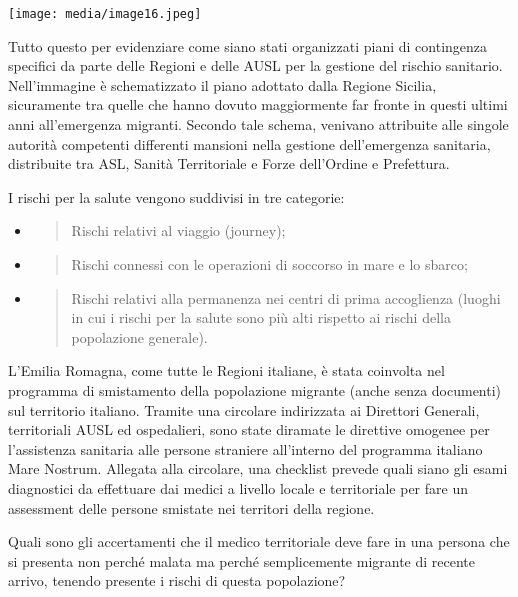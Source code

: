 \documentclass[]{article}
\begin{document}
\texttt{[image: media/image16.jpeg]}

Tutto questo per evidenziare come siano stati organizzati piani di
contingenza specifici da parte delle Regioni e delle AUSL per la
gestione del rischio sanitario. Nell'immagine è schematizzato il piano
adottato dalla Regione Sicilia, sicuramente tra quelle che hanno dovuto
maggiormente far fronte in questi ultimi anni all'emergenza migranti.
Secondo tale schema, venivano attribuite alle singole autorità
competenti differenti mansioni nella gestione dell'emergenza sanitaria,
distribuite tra ASL, Sanità Territoriale e Forze dell'Ordine e
Prefettura.

I rischi per la salute vengono suddivisi in tre categorie:

\begin{itemize}
\item
  \begin{quote}
  Rischi relativi al viaggio (journey);
  \end{quote}
\item
  \begin{quote}
  Rischi connessi con le operazioni di soccorso in mare e lo sbarco;
  \end{quote}
\item
  \begin{quote}
  Rischi relativi alla permanenza nei centri di prima accoglienza
  (luoghi in cui i rischi per la salute sono più alti rispetto ai rischi
  della popolazione generale).
  \end{quote}
\end{itemize}

L'Emilia Romagna, come tutte le Regioni italiane, è stata coinvolta nel
programma di smistamento della popolazione migrante (anche senza
documenti) sul territorio italiano. Tramite una circolare indirizzata ai
Direttori Generali, territoriali AUSL ed ospedalieri, sono state
diramate le direttive omogenee per l'assistenza sanitaria alle persone
straniere all'interno del programma italiano Mare Nostrum. Allegata alla
circolare, una checklist prevede quali siano gli esami diagnostici da
effettuare dai medici a livello locale e territoriale per fare un
assessment delle persone smistate nei territori della regione.

Quali sono gli accertamenti che il medico territoriale deve fare in una
persona che si presenta non perché malata ma perché semplicemente
migrante di recente arrivo, tenendo presente i rischi di questa
popolazione?
\end{document}
